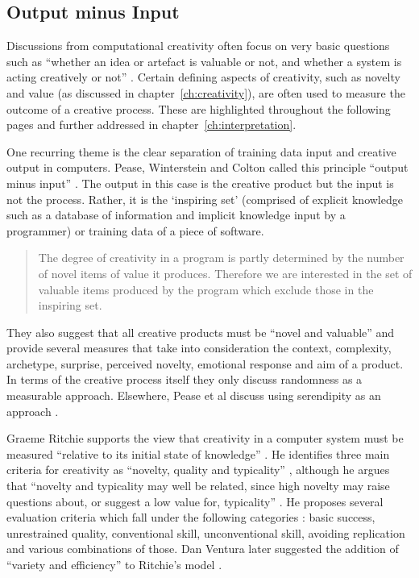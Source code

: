 \subsection{Output minus Input}
\label{s:o-i}

Discussions from computational creativity often focus on very basic questions such as ``whether an idea or artefact is valuable or not, and whether a system is acting creatively or not'' \autocite{Pease2011}. Certain defining aspects of creativity, such as novelty and value (as discussed in chapter~\ref{ch:creativity}), are often used to measure the outcome of a creative process. These are highlighted throughout the following pages and further addressed in chapter~\ref{ch:interpretation}.
 
One recurring theme is the clear separation of training data input and creative output in computers. Pease, Winterstein and Colton called this principle ``output minus input'' \autocite*{Pease2001}. The output in this case is the creative product but the input is not the process. Rather, it is the `inspiring set' (comprised of explicit knowledge such as a database of information and implicit knowledge input by a programmer) or training data of a piece of software.

\begin{quotation}
  The degree of creativity in a program is partly determined by the number of novel items of value it produces. Therefore we are interested in the set of valuable items produced by the program which exclude those in the inspiring set. 
\end{quotation}

They also suggest that all creative products must be ``novel and valuable'' \autocite{Pease2001} and provide several measures that take into consideration the context, complexity, archetype, surprise, perceived novelty, emotional response and aim of a product. In terms of the creative process itself they only discuss randomness as a measurable approach. Elsewhere, Pease et al discuss using serendipity as an approach \autocite*{Pease2013}.

Graeme Ritchie supports the view that creativity in a computer system must be measured ``relative to its initial state of knowledge'' \autocite*{Ritchie2007}. He identifies three main criteria for creativity as ``novelty, quality and typicality'' \autocite*{Ritchie2007}, although he argues that ``novelty and typicality may well be related, since high novelty may raise questions about, or suggest a low value for, typicality'' \autocite*{Ritchie2001,Ritchie2007}. He proposes several evaluation criteria which fall under the following categories \autocite*{Ritchie2007}: basic success, unrestrained quality, conventional skill, unconventional skill, avoiding replication and various combinations of those. Dan Ventura later suggested the addition of ``variety and efficiency'' to Ritchie's model \autocite*{Ventura2008}.

